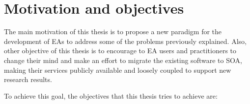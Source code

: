 \section{Motivation and objectives} %
\label{sec:intro:motivation}

The main motivation of this thesis is to propose a new paradigm for
the development of EAs to address some of the problems %
previously
explained. Also, other objective of this thesis is to encourage to EA
users and practitioners to change their mind and make an effort to
migrate the existing software to SOA, making their services publicly
available and loosely coupled to support new research results. 


To achieve this goal, the objectives that this thesis tries to achieve are:

\newcommand{\objectiveparadigm}{Propose a new paradigm to address some of the problems in the EA field}

